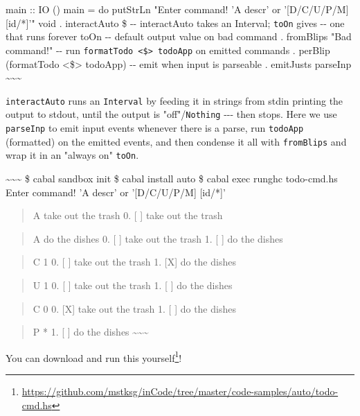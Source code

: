 \documentclass[]{article}
\renewcommand{\href}[2]{#2\footnote{\url{#1}}}
\begin{document}
main :: IO () main = do putStrLn "Enter command! 'A descr' or '{[}D/C/U/P/M{]}
{[}id/*{]}'" void . interactAuto \$ -\/- interactAuto takes an Interval;
\texttt{toOn} gives -\/- one that runs forever toOn -\/- default output value on
bad command . fromBlips "Bad command!" -\/- run
\texttt{formatTodo\ \textless{}\$\textgreater{}\ todoApp} on emitted commands .
perBlip (formatTodo \textless{}\$\textgreater{} todoApp) -\/- emit when input is
parseable . emitJusts parseInp
\textasciitilde{}\textasciitilde{}\textasciitilde{}

\texttt{interactAuto} runs an \texttt{Interval} by feeding it in strings from
stdin printing the output to stdout, until the output is "off"/\texttt{Nothing}
-\/-\/- then stops. Here we use \texttt{parseInp} to emit input events whenever
there is a parse, run \texttt{todoApp} (formatted) on the emitted events, and
then condense it all with \texttt{fromBlips} and wrap it in an "always on"
\texttt{toOn}.

\textasciitilde{}\textasciitilde{}\textasciitilde{} \$ cabal sandbox init \$
cabal install auto \$ cabal exec runghc todo-cmd.hs Enter command! 'A descr' or
'{[}D/C/U/P/M{]} {[}id/*{]}'

\begin{quote}
A take out the trash 0. {[} {]} take out the trash
\end{quote}

\begin{quote}
A do the dishes 0. {[} {]} take out the trash 1. {[} {]} do the dishes
\end{quote}

\begin{quote}
C 1 0. {[} {]} take out the trash 1. {[}X{]} do the dishes
\end{quote}

\begin{quote}
U 1 0. {[} {]} take out the trash 1. {[} {]} do the dishes
\end{quote}

\begin{quote}
C 0 0. {[}X{]} take out the trash 1. {[} {]} do the dishes
\end{quote}

\begin{quote}
P * 1. {[} {]} do the dishes \textasciitilde{}\textasciitilde{}\textasciitilde{}
\end{quote}

You can
\href{https://github.com/mstksg/inCode/tree/master/code-samples/auto/todo-cmd.hs}{download
and run this yourself}!
\end{document}
